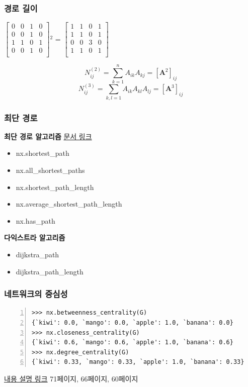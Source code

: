 \documentclass{beamer}
\begin{document}
\begin{frame}[fragile]
\frametitle{경로 길이}
\begin{center}
\huge
{\(
  \begin{bmatrix}
    0 & 0 & 1 & 0\\
    0 & 0 & 1 & 0\\
    1 & 1 & 0 & 1\\
    0 & 0 & 1 & 0\\
  \end{bmatrix}
\)$^2$}
=
\(
  \begin{bmatrix}
    1 & 1 & 0 & 1\\
    1 & 1 & 0 & 1\\
    0 & 0 & 3 & 0\\
    1 & 1 & 0 & 1\\
  \end{bmatrix}
\)
\end{center}
\begin{equation*}
N_{ij}^{(2)}=\sum_{k=1}^{n}A_{ik}A_{kj}=[\mathbf{A}^2]_{ij}
\end{equation*}
\begin{equation*}
N_{ij}^{(3)}=\sum_{k,l=1}A_{ik}A_{kl}A_{lj}=[\mathbf{A}^3]_{ij}
\end{equation*}
\end{frame}

\begin{frame}
\frametitle{최단 경로}
\textbf{최단 경로 알고리즘} {\tiny{\textcolor{red}{\href{http://networkx.lanl.gov/reference/generated/networkx.algorithms.shortest_paths.generic.shortest_path.html}{문서 링크}}}}
\begin{itemize}
\item nx.shortest\_path
\item nx.all\_shortest\_paths
\item nx.shortest\_path\_length
\item nx.average\_shortest\_path\_length
\item nx.has\_path
\end{itemize}
\textbf{다익스트라 알고리즘}
\begin{itemize}
\item dijkstra\_path
\item dijkstra\_path\_length
\end{itemize}
\end{frame}

\begin{frame}[fragile]
\frametitle{네트워크의 중심성}
\begin{block}{}
	\begin{Verbatim}[numbers=left,commandchars=\\\{\}]
>>> nx.betweenness_centrality(G)
{`kiwi': 0.0, `mango': 0.0, `apple': 1.0, `banana': 0.0}
>>> nx.closeness_centrality(G)
{`kiwi': 0.6, `mango': 0.6, `apple': 1.0, `banana': 0.6}
>>> nx.degree_centrality(G)
{`kiwi': 0.33, `mango': 0.33, `apple': 1.0, `banana': 0.33}
	\end{Verbatim}
\end{block}
\textcolor{red}{\href{http://www.slideshare.net/koorukuroo/network-analysis-with-networkx-fundamentals-of-network-theory1}{내용 설명 링크}} {\tiny{71페이지, 66페이지, 60페이지}}
\end{frame}
\end{document}
